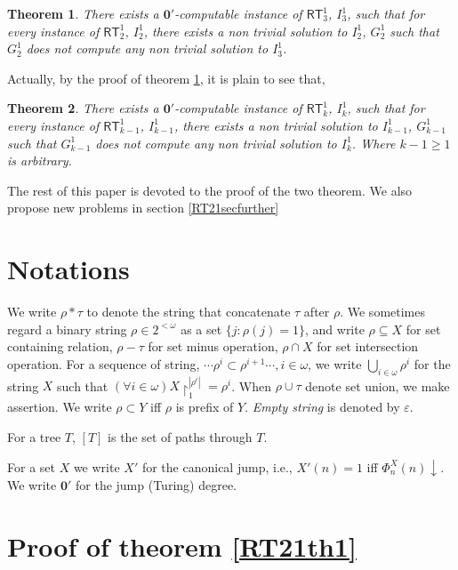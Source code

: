 \documentclass[options]{amsart}
\newtheorem{theorem}{Theorem}[section]
\theoremstyle{definition}
\theoremstyle{remark}
\newtheorem{Ramsey's theorem}[theorem]{Ramsey's theorem}
\begin{document}
\begin{theorem}\label{RT21th2}
There exists a $\mathbf{0}'$-computable
 instance of $\mathsf{RT}_3^1$,
$I_3^1$, such that
for every instance of $\mathsf{RT}_2^1$,
$I_2^1$,
there exists a non trivial solution to
$I_2^1$, $G_2^1$ such that $G_2^1$ does not
 compute any non trivial solution to
 $I_3^1$.

\end{theorem}

Actually, by the proof of theorem \ref{RT21th2},
it is plain to see that,
\begin{theorem}

There exists a $\mathbf{0}'$-computable
 instance of $\mathsf{RT}_{k}^1$,
$I_k^1$, such that
for every instance of $\mathsf{RT}_{k-1}^1$,
$I_{k-1}^1$,
there exists a non trivial solution to
$I_{k-1}^1$, $G_{k-1}^1$ such that $G_{k-1}^1$ does not
 compute any non trivial solution to
 $I_k^1$. Where $k-1\geq 1$ is arbitrary.
\end{theorem}

The rest of this paper is devoted to the
proof of the two theorem. We also propose
new problems in section \ref{RT21secfurther}

\section{Notations}
We write $\rho *\tau$ to denote the string
that concatenate $\tau$ after $\rho$.
We sometimes regard a binary string
$\rho\in 2^{<\omega}$ as a set
$\{j:\rho(j)=1\}$, and
write $\rho\subseteq X$ for
set containing relation,
$\rho-\tau$ for set minus operation,
$\rho\cap X$ for set intersection
operation. For a sequence of string,
$\cdots
\rho^i\subset \rho^{i+1}\cdots, i\in\omega$,
we write
$\bigcup\limits_{i\in\omega}\rho^i$
for the string $X$ such that
$(\forall i\in\omega)
X\upharpoonright_{1}^{|\rho^i|}=\rho^i$.
When $\rho\cup\tau$ denote set union,
we make assertion.
We write $\rho\subset Y$ iff
$\rho$ is prefix of $Y$.
\emph{Empty string} is denoted by
$\varepsilon$.

For a tree $T$, $[T]$ is
the set of paths through $T$.

For a set $X$ we write
$X'$ for the canonical jump,
i.e.,
$X'(n) = 1$ iff $\Phi_n^X(n)\downarrow$.
We write $\mathbf{0}'$ for the jump
(Turing) degree.

\section{Proof of theorem \ref{RT21th1}}
\end{document}
